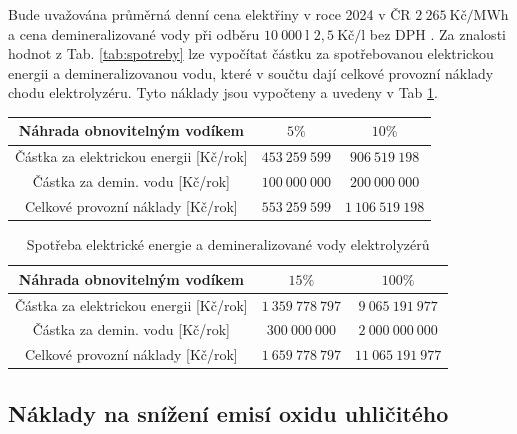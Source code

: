 Bude uvažována průměrná denní cena elektřiny v roce 2024 v ČR $2\ 265\ \mathrm{\text{Kč/MWh}}$ \cite{cena_elektriny} a cena demineralizované vody při odběru $10\ 000\ \mathrm{l}$ $2,5\ \mathrm{\text{Kč/l}}$ bez DPH \cite{cena_demivoda}. Za znalosti hodnot z Tab. \ref{tab:spotreby} lze vypočítat částku za spotřebovanou elektrickou energii a demineralizovanou vodu, které v součtu dají celkové provozní náklady chodu elektrolyzéru. Tyto náklady jsou vypočteny a uvedeny v Tab \ref{tab:naklady}.
\begin{table}[h]
    \centering
    \begin{tabular}{|c|c|c|}
        \hline
        Náhrada obnovitelným vodíkem & $5\%$ & $10\%$\\ \hline
        Částka za elektrickou energii [Kč/rok] & $453\ 259\ 599$ & $906\ 519\ 198$ \\ \hline
        Částka za demin. vodu [Kč/rok] & $100\ 000\ 000$ & $200\ 000\ 000$ \\ \hline\hline
        Celkové provozní náklady [Kč/rok] & $553\ 259\ 599$ & $1\ 106\ 519\ 198$\\ \hline
    \end{tabular}
\end{table}
\begin{table}[h]
    \centering
    \begin{tabular}{|c|c|c|}
        \hline
        Náhrada obnovitelným vodíkem & $15\%$ & $100\%$\\ \hline
        Částka za elektrickou energii [Kč/rok] & $1\ 359\ 778\ 797$ & $9\ 065\ 191\ 977$\\ \hline
        Částka za demin. vodu [Kč/rok] & $300\ 000\ 000$ & $2\ 000\ 000\ 000$\\ \hline\hline
        Celkové provozní náklady [Kč/rok] & $1\ 659\ 778\ 797$ & $11\ 065\ 191\ 977$\\ \hline
    \end{tabular}
    \caption[Spotřeba elektrické energie a demineralizované vody elektrolyzérů]{Spotřeba elektrické energie a demineralizované vody elektrolyzérů}
    \label{tab:naklady}
\end{table}

\subsection{Náklady na snížení emisí oxidu uhličitého}

